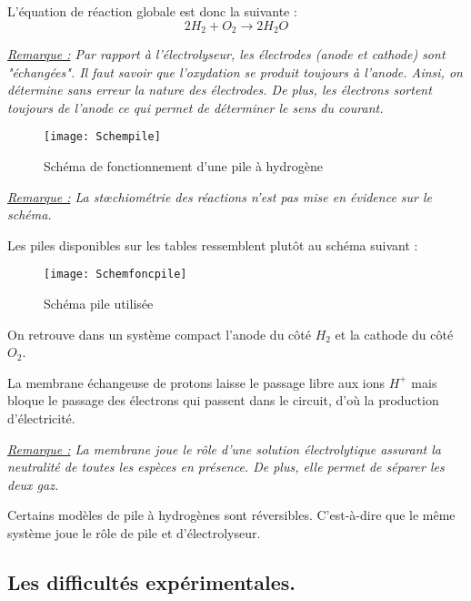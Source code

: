 \documentclass[a4paper, 11pt, twoside]{article}
\numberwithin{equation}{subsection}
\newcommand{\couleur}[1]{\ifbool{Couleur}{\color{#1}}{}}
\newcounter{th}\newcommand{\Thm}[2][]{\couleur{brown}\vspace{3ex}\boxput*(-0.4,1){\setlength{\fboxsep}{0pt}\colorbox{white}{\setlength{\fboxsep}{1ex}\Ovalbox{{\textsc{\ifstrequal{#1}{}{Théorème \stepcounter{th} \theth \phantom{}}{Théorème \stepcounter{th} \theth \phantom{} : #1}}}}}}{\setlength{\fboxsep}{7mm}\doublebox{\noindent \begin{minipage}{0.95\linewidth}\vspace{1ex}#2\end{minipage}}}\vspace{1ex}\couleur{black}}
\newcommand{\rem}[1]{\textit{\underline{Remarque :} #1}}
\begin{document}
	L'équation de réaction globale est donc la suivante :
	\begin{equation}\label{pile}
		2H_2 + O_2 \rightarrow 2H_2O
	\end{equation}
	
	\rem{Par rapport à l'électrolyseur, les électrodes (anode et cathode) sont "échangées". Il faut savoir que l'oxydation se produit \emph{toujours} à l'anode. Ainsi, on détermine sans erreur la nature des électrodes. De plus, les électrons sortent \emph{toujours} de l'anode ce qui permet de déterminer le sens du courant.}
	
	\begin{figure}[!h]
		\begin{center}
			\texttt{[image: Schempile]}
			\caption{Schéma de fonctionnement d'une pile à hydrogène}
		\end{center}
	\end{figure}
	
	\rem{La st\oe chiométrie des réactions n'est pas mise en évidence sur le schéma.}
	
	\vspace{5 cm}
	Les piles disponibles sur les tables ressemblent plutôt au schéma suivant :
	
	\begin{figure}[!h]
		\begin{center}
			\texttt{[image: Schemfoncpile]}
			\caption{Schéma pile utilisée}
		\end{center}
	\end{figure}
	
	On retrouve dans un système compact l'anode du côté $H_2$ et la cathode du côté $O_2$. 
	
	La membrane échangeuse de protons laisse le passage libre aux ions $H^+$ mais bloque le passage des électrons qui passent dans le circuit, d'où la production d'électricité.
	
	\rem{La membrane joue le rôle d'une solution électrolytique assurant la neutralité de toutes les espèces en présence. De plus, elle permet de séparer les deux gaz.}
	
	Certains modèles de pile à hydrogènes sont réversibles. C'est-à-dire que le même système joue le rôle de pile et d'électrolyseur.
	
	\subsection{Les difficultés expérimentales.}
	
\end{document}
